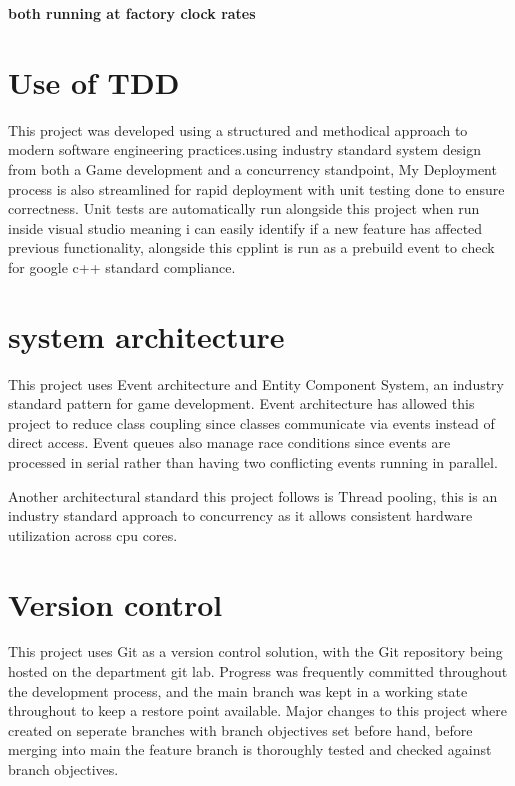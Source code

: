 \documentclass[]{final_report}
\begin{document}
\textbf{both running at factory clock rates} \newline

\section{Use of TDD}
This project was developed using a structured and methodical approach to modern software engineering practices.using industry standard system design from both a Game development and a concurrency standpoint, My Deployment process is also streamlined for rapid deployment with unit testing done to ensure correctness. Unit tests are automatically run alongside this project when run inside visual studio meaning i can easily identify if a new feature has affected previous functionality, alongside this cpplint is run as a prebuild event to check for google c++ standard compliance.
\section{system architecture}
This project uses Event architecture and Entity Component System, an industry standard pattern for game development. Event architecture has allowed this project to reduce class coupling since classes communicate via events instead of direct access. Event queues also manage race conditions since events are processed in serial rather than having two conflicting events running in parallel. 

Another architectural standard this project follows is Thread pooling, this is an industry standard approach to concurrency as it allows consistent hardware utilization across cpu cores. 

\section{Version control}
This project uses Git as a version control solution, with the Git repository being hosted on the department git lab. Progress was frequently committed throughout the development process, and the main branch was kept in a working state throughout to keep a restore point available. Major changes to this project where created on seperate branches with branch objectives set before hand, before merging into main the feature branch is thoroughly tested and checked against branch objectives.
\newpage
\end{document}
